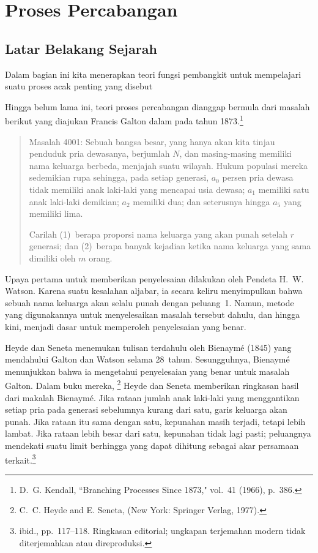 \section{Proses Percabangan}\label{sec 10.2}
\subsection*{Latar Belakang Sejarah}
Dalam bagian ini kita menerapkan teori fungsi pembangkit untuk mempelajari suatu
proses acak penting yang disebut 

Hingga belum lama ini, teori proses percabangan dianggap bermula
dari masalah berikut yang diajukan Francis Galton dalam  pada tahun 1873.\footnote{D.~G. Kendall, ``Branching Processes Since
1873,"  vol.~41 (1966), p.~386.}
\begin{quote}
Masalah 4001: Sebuah bangsa besar, yang hanya akan kita tinjau penduduk
pria dewasanya, berjumlah $N$, dan masing-masing memiliki nama keluarga berbeda, menjajah suatu
wilayah.  Hukum populasi mereka sedemikian rupa sehingga, pada setiap generasi, $a_0$ 
persen pria dewasa tidak memiliki anak laki-laki yang mencapai usia dewasa;
$a_1$ memiliki satu anak laki-laki demikian; $a_2$ memiliki dua; dan seterusnya hingga
$a_5$ yang memiliki lima.

Carilah (1)~berapa proporsi nama keluarga yang akan punah setelah $r$
generasi; dan (2)~berapa banyak kejadian ketika nama keluarga yang sama
dimiliki oleh $m$ orang.
\end{quote}

Upaya pertama untuk memberikan penyelesaian dilakukan oleh Pendeta H.~W. Watson. 
Karena suatu kesalahan aljabar, ia secara keliru menyimpulkan bahwa sebuah nama keluarga akan selalu
punah dengan peluang~1.  Namun, metode yang digunakannya untuk menyelesaikan
masalah tersebut dahulu, dan hingga kini, menjadi dasar untuk memperoleh penyelesaian yang benar.
\par
Heyde dan Seneta menemukan tulisan terdahulu oleh
Bienaym\'e (1845) yang mendahului Galton dan Watson selama 28~tahun. 
Sesungguhnya, Bienaym\'e menunjukkan bahwa ia mengetahui penyelesaian yang benar untuk masalah Galton. 
Dalam buku mereka, \footnote{C.~C. Heyde and E. Seneta,  (New York: Springer Verlag, 1977).} Heyde dan Seneta memberikan
ringkasan hasil dari makalah Bienaym\'e. Jika rataan jumlah anak laki-laki yang menggantikan
setiap pria pada generasi sebelumnya kurang dari satu, garis keluarga akan punah. Jika rataan itu
sama dengan satu, kepunahan masih terjadi, tetapi lebih lambat. Jika rataan lebih besar dari satu,
kepunahan tidak lagi pasti; peluangnya mendekati suatu limit berhingga yang dapat dihitung sebagai
akar persamaan terkait.\footnote{ibid., pp.~117--118. Ringkasan editorial; ungkapan terjemahan
modern tidak diterjemahkan atau direproduksi.}

